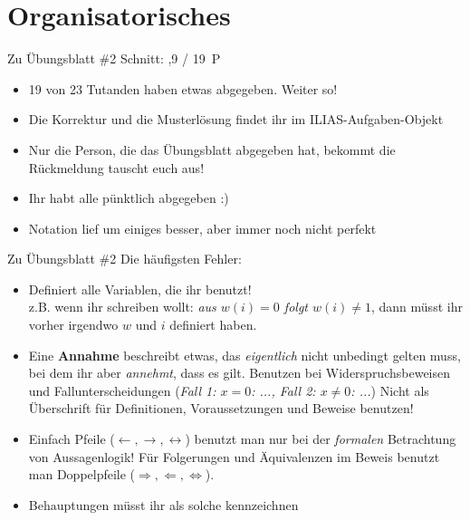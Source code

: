 



\morescalingdelimiters



\section{Organisatorisches}

\begin{frame}{Zu Übungsblatt \#2}
	Schnitt: ,9 / 19~P

	\begin{itemize}[<+->]
		\item 19 von 23 Tutanden haben etwas abgegeben. Weiter so!
		\item Die Korrektur und die Musterlösung findet ihr im ILIAS-Aufgaben-Objekt
		\item Nur die Person, die das Übungsblatt abgegeben hat, bekommt die Rückmeldung \impl tauscht euch aus!
		\item Ihr habt alle pünktlich abgegeben :)
		\item Notation lief um einiges besser, aber immer noch nicht perfekt
	\end{itemize}
\end{frame}

\begin{frame}{Zu Übungsblatt \#2}
	Die häufigsten Fehler:
	\begin{itemize}[<+->]
		\item Definiert alle Variablen, die ihr benutzt! \\
			z.B. wenn ihr schreiben wollt: \textit{aus $w(i)=0$ folgt $w(i) \not = 1$}, dann müsst ihr vorher irgendwo $w$ und $i$ definiert haben.
		\item Eine \textbf{Annahme} beschreibt etwas, das \textit{eigentlich} nicht unbedingt gelten muss, bei dem ihr aber \textit{annehmt}, dass es gilt.
		\implitem Benutzen bei Widerspruchsbeweisen und Fallunterscheidungen (\textit{Fall 1: $x=0$: ..., Fall 2: $x \not = 0$: ...})
		\implitem Nicht als Überschrift für Definitionen, Voraussetzungen und Beweise benutzen!
		\item Einfach Pfeile ($\leftarrow, \rightarrow, \leftrightarrow$) benutzt man nur bei der \textit{formalen} Betrachtung von Aussagenlogik!
		\implitem Für Folgerungen und Äquivalenzen im Beweis benutzt man Doppelpfeile ($\Rightarrow, \Leftarrow, \Leftrightarrow$).
		\item Behauptungen müsst ihr als solche kennzeichnen
	\end{itemize}
\end{frame}

